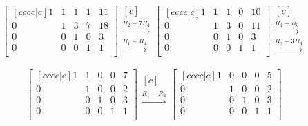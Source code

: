 \begin{equation*}
\begin{bmatrix}[cccc|c]
1 & 1 & 1 & 1 & 11 \\
0 & 1 & 3 & 7 & 18 \\
0 & 0 & 1 & 0 & 3 \\
0 & 0 & 0 & 1 & 1 \\
\end{bmatrix}
\begin{matrix}[c]
~ \\
\xrightarrow{R_2-7R_4} \\
\xrightarrow{R_1-R_4} \\
\end{matrix}
\begin{bmatrix}[cccc|c]
1 & 1 & 1 & 0 & 10 \\
0 & 1 & 3 & 0 & 11 \\
0 & 0 & 1 & 0 & 3 \\
0 & 0 & 0 & 1 & 1 \\
\end{bmatrix}
\begin{matrix}[c]
~ \\
\xrightarrow{R_1-R_3} \\
\xrightarrow{R_2-3R_3} \\
\end{matrix}
\end{equation*}

\begin{equation*}
\begin{bmatrix}[cccc|c]
1 & 1 & 0 & 0 & 7 \\
0 & 1 & 0 & 0 & 2 \\
0 & 0 & 1 & 0 & 3 \\
0 & 0 & 0 & 1 & 1 \\
\end{bmatrix}
\begin{matrix}[c]
~ \\
\xrightarrow{R_1-R_2} \\
~ \\
\end{matrix}
\begin{bmatrix}[cccc|c]
1 & 0 & 0 & 0 & 5 \\
0 & 1 & 0 & 0 & 2 \\
0 & 0 & 1 & 0 & 3 \\
0 & 0 & 0 & 1 & 1 \\
\end{bmatrix}
\end{equation*}

